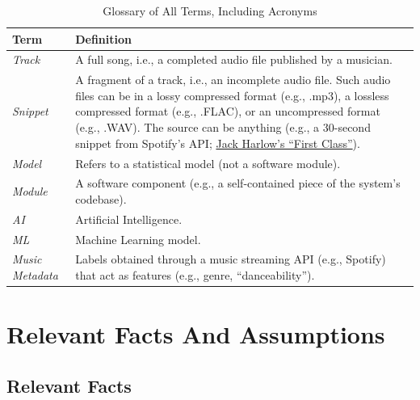 \documentclass[12pt]{article}
\begin{document}
\begin{table}[ht]
  \centering
  \caption{Glossary of All Terms, Including Acronyms}
  \label{tab:glossary}
  \begin{tabular}{p{3cm} p{10cm}}
  \hline
  \textbf{Term} & \textbf{Definition} \\
  \hline
  \textit{Track} &
  A full song, i.e., a completed audio file published by a musician. \\[6pt]
  
  \textit{Snippet} &
  A fragment of a track, i.e., an incomplete audio file. Such audio files can be in a lossy compressed format (e.g., .mp3), 
  a lossless compressed format (e.g., .FLAC), or an uncompressed format (e.g., .WAV). The source can be anything 
  (e.g., a 30-second snippet from Spotify’s API; \href{https://p.scdn.co/mp3-preview/c05a687254dbdf50a9ab4879d85e54a7594e367f?cid=945b9ed74f4c43b49bcf26e7dc388df0}{Jack Harlow's ``First Class''}). \\[6pt]
  
  \textit{Model} &
  Refers to a statistical model (not a software module). \\[6pt]
  
  \textit{Module} &
  A software component (e.g., a self-contained piece of the system’s codebase). \\[6pt]
  
  \textit{AI} &
  Artificial Intelligence. \\[6pt]
  
  \textit{ML} &
  Machine Learning model. \\[6pt]
  
  \textit{Music Metadata} &
  Labels obtained through a music streaming API (e.g., Spotify) that act as features (e.g., genre, “danceability”). \\
  \hline
  \end{tabular}
  \end{table}
  

\section{Relevant Facts And Assumptions}
\subsection{Relevant Facts}
\end{document}
